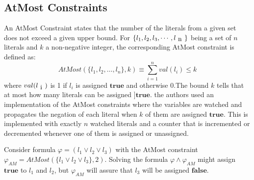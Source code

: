 \subsection{AtMost Constraints}
 An AtMost Constraint states that the number of the literals from a given set does not exceed a given upper bound. For $\{l_{1}, l_{2}, l_{3},\cdots ,l_{\text n}\}$ being a set of $n$ literals and $k$ a non-negative integer, the corresponding AtMost constraint is defined as:
$$AtMost(\{l_{1},l_{2},\ldots,l_{n}\},k)\equiv \sum\limits^{n}_{i=1} val(l_{i})\leqslant k$$
where $val(l_{\text i})$ is 1 if $l_{i}$ is assigned $\mathbf{true}$ and otherwise 0.The bound $k$ tells that at most how many literals can be assigned $]\mathbf{true}$.\newline
the authors used an implementation of the AtMost constraints where the variables are watched and propagates the negation of each literal when $k$ of them are assigned $\mathbf{true}$. This is implemented with exactly $n$ watched literals and a counter that is incremented or decremented whenever one of them is assigned or unassigned.
\begin{example}
Consider formula $\varphi = (l_{1}\vee l_{2}\vee l_{3})$ with the AtMost constraint $\varphi_{AM}=AtMost(\{l_{1}\vee l_{2}\vee l_{3}\}, 2)$. Solving the formula $\varphi
\wedge \varphi_{AM}$ might assign $\mathbf{true}$ to $l_{1}$ and $l_{2}$, but $\varphi_{AM}$ will assure that $l_{3}$ will be assigned $\mathbf{false}$.
\end{example}
